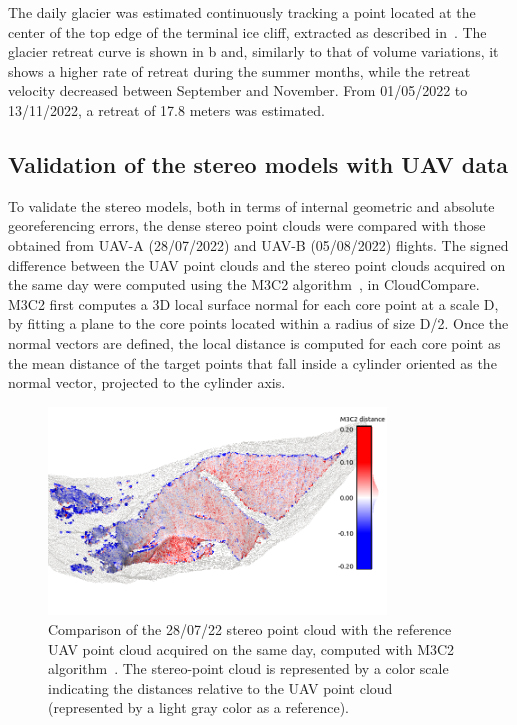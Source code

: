 The daily glacier was estimated continuously tracking a point located at the center of the top edge of the terminal ice cliff, extracted as described in~.
The glacier retreat curve is shown in b and, similarly to that of volume variations, it shows a higher rate of retreat during the summer months, while the retreat velocity decreased between September and November.
From 01/05/2022 to 13/11/2022, a retreat of 17.8 meters was estimated.

\subsection{Validation of the stereo models with UAV data}\label{sec:4:res_uav_validation}

To validate the stereo models, both in terms of internal geometric and absolute
georeferencing errors, the dense stereo point clouds were compared with those obtained from UAV-A (28/07/2022) and UAV-B (05/08/2022) flights.
The signed difference between the UAV point clouds and the stereo point clouds acquired on the same day were computed using the M3C2 algorithm~\citep{lague2013accurate}, in CloudCompare.
M3C2 first computes a 3D local surface normal for each core point at a scale
D, by fitting a plane to the core points located within a radius of size D/2.
Once the normal vectors are defined, the local distance is computed for each core point as the mean distance of the target points that fall inside a cylinder oriented as the normal vector, projected to the cylinder axis.

\begin{figure}
  \centering
  \includegraphics[width=0.8\textwidth]{4_stereo_uav_2807.png}
  \caption{Comparison of the 28/07/22 stereo point cloud with the reference UAV point cloud acquired on the same day, computed with M3C2 algorithm~\citep{lague2013accurate}. The stereo-point cloud is represented by a color scale indicating the distances relative to the UAV point cloud (represented by a light gray color as a reference).}
  \label{fig:4:stereo_uav_2807}
\end{figure}


